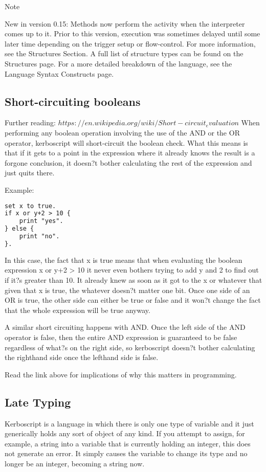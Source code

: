 Note

New in version 0.15: Methods now perform the activity when the interpreter comes up to it. Prior to this version, execution was sometimes delayed until some later time depending on the trigger setup or flow-control.
For more information, see the Structures Section. A full list of structure types can be found on the Structures page. For a more detailed breakdown of the language, see the Language Syntax Constructs page.

\subsection{Short-circuiting booleans}
Further reading: $https://en.wikipedia.org/wiki/Short-circuit_evaluation
$
When performing any boolean operation involving the use of the AND or the OR operator, kerboscript will short-circuit the boolean check. What this means is that if it gets to a point in the expression where it already knows the result is a forgone conclusion, it doesn?t bother calculating the rest of the expression and just quits there.

Example:

\begin{lstlisting}[frame=single,language=XML]
set x to true.
if x or y+2 > 10 {
    print "yes".
} else {
    print "no".
}.
\end{lstlisting}

In this case, the fact that x is true means that when evaluating the boolean expression x or y+2 > 10 it never even bothers trying to add y and 2 to find out if it?s greater than 10. It already knew as soon as it got to the x or whatever that given that x is true, the whatever doesn?t matter one bit. Once one side of an OR is true, the other side can either be true or false and it won?t change the fact that the whole expression will be true anyway.

A similar short circuiting happens with AND. Once the left side of the AND operator is false, then the entire AND expression is guaranteed to be false regardless of what?s on the right side, so kerboscript doesn?t bother calculating the righthand side once the lefthand side is false.

Read the link above for implications of why this matters in programming.

\subsection{Late Typing}
Kerboscript is a language in which there is only one type of variable and it just generically holds any sort of object of any kind. If you attempt to assign, for example, a string into a variable that is currently holding an integer, this does not generate an error. It simply causes the variable to change its type and no longer be an integer, becoming a string now.

